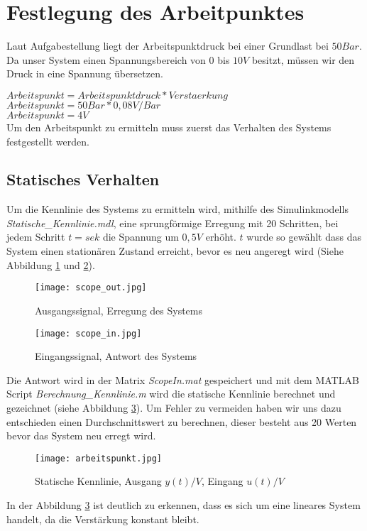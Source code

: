 

\newpage
[Hansert]
\section{Festlegung des Arbeitpunktes}

Laut Aufgabestellung liegt der Arbeitspunktdruck bei einer Grundlast bei $50Bar$. Da unser System einen Spannungsbereich von 0 bis $10V$ besitzt, müssen wir den Druck in eine Spannung übersetzen.

$Arbeitspunkt = Arbeitspunktdruck * Verstaerkung$\\
$Arbeitspunkt = 50Bar * 0,08V/Bar$\\
$Arbeitspunkt = 4V$\\ 


Um den Arbeitspunkt zu ermitteln muss zuerst das Verhalten des Systems festgestellt werden.


\subsection{Statisches Verhalten}
Um die Kennlinie des Systems zu ermitteln wird, mithilfe des Simulinkmodells \textit{Statische\_Kennlinie.mdl}, eine sprungförmige Erregung mit 20 Schritten, bei jedem Schritt $t= sek$ die Spannung um $0,5V$ erhöht. $t$ wurde so gewählt dass das System einen stationären Zustand erreicht, bevor es neu angeregt wird (Siehe Abbildung \ref{ScopOut} und \ref{ScopIn}).

\begin{figure}[h]
	\begin{center}
		\texttt{[image: scope\_out.jpg]}
		\caption{Ausgangssignal, Erregung des Systems}
       \label{ScopOut}
	\end{center} 
\end{figure}


\begin{figure}[h]
	\begin{center}
		\texttt{[image: scope\_in.jpg]}
		\caption{Eingangssignal, Antwort des Systems}
       \label{ScopIn}
	\end{center} 
\end{figure}

Die Antwort wird in der Matrix \textit{ScopeIn.mat} gespeichert und mit dem MATLAB Script \textit{Berechnung\_Kennlinie.m} wird die statische Kennlinie berechnet und gezeichnet (siehe Abbildung \ref{StatKenn}). Um Fehler zu vermeiden haben wir uns dazu entschieden einen Durchschnittswert zu berechnen, dieser besteht aus 20 Werten bevor das System neu erregt wird.


\begin{figure}[h]
	\begin{center}
		\texttt{[image: arbeitspunkt.jpg]}
		\caption{Statische Kennlinie, Ausgang $y(t)/V$, Eingang $u(t)/V$}
       \label{StatKenn}
	\end{center} 
\end{figure}

In der Abbildung \ref{StatKenn} ist deutlich zu erkennen, dass es sich um eine lineares System handelt, da die Verstärkung konstant bleibt.